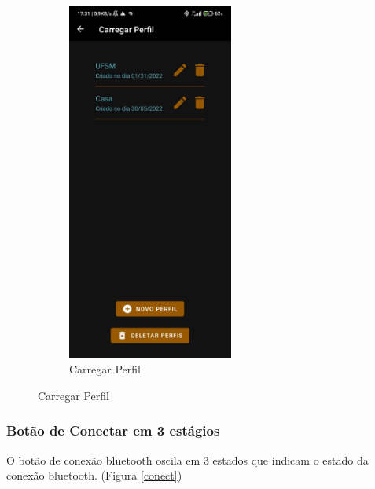 \begin{figure}[H]
\begin{subfigure}[b]{0.4\textwidth}
		\includegraphics[width=0.6\textwidth]{figuras/desAplicativo/load}
		\caption{Carregar Perfil}
		\label{load}
	\end{subfigure}
\end{figure}

\subsubsection{Botão de Conectar em 3 estágios}
O botão de conexão bluetooth oscila em 3 estados que indicam o estado da conexão bluetooth. (Figura \ref{conect})

